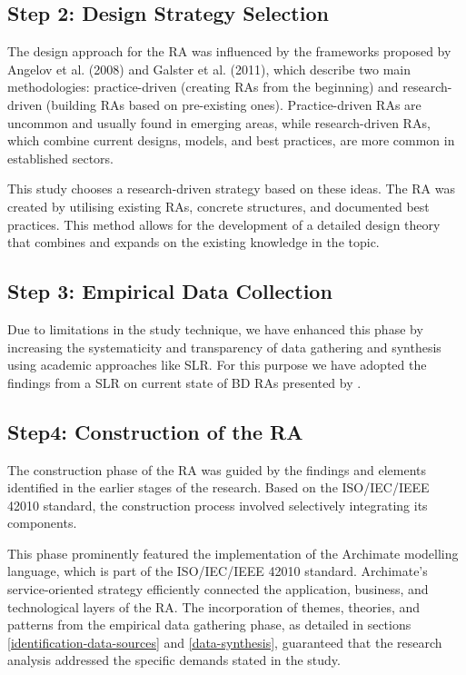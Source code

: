 \documentclass[journal]{IEEEtran}
\begin{document}
\subsection{Step 2: Design Strategy Selection}

The design approach for the RA was influenced by the frameworks proposed by Angelov et al. (2008) and Galster et al. (2011), which describe two main methodologies: practice-driven (creating RAs from the beginning) and research-driven (building RAs based on pre-existing ones). Practice-driven RAs are uncommon and usually found in emerging areas, while research-driven RAs, which combine current designs, models, and best practices, are more common in established sectors.

This study chooses a research-driven strategy based on these ideas. The RA was created by utilising existing RAs, concrete structures, and documented best practices. This method allows for the development of a detailed design theory that combines and expands on the existing knowledge in the topic.

\subsection{Step 3: Empirical Data Collection} \label{theSLR}

Due to limitations in the study technique, we have enhanced this phase by increasing the systematicity and transparency of data gathering and synthesis using academic approaches like SLR. For this purpose we have adopted the findings from a SLR on current state of BD RAs presented by \cite{ataei2022state}.

\subsection{Step4: Construction of the RA}
The construction phase of the RA was guided by the findings and elements identified in the earlier stages of the research. Based on the ISO/IEC/IEEE 42010 standard, the construction process involved selectively integrating its components.

This phase prominently featured the implementation of the Archimate modelling language, which is part of the ISO/IEC/IEEE 42010 standard. Archimate's service-oriented strategy efficiently connected the application, business, and technological layers of the RA. The incorporation of themes, theories, and patterns from the empirical data gathering phase, as detailed in sections \ref{identification-data-sources} and \ref{data-synthesis}, guaranteed that the research analysis addressed the specific demands stated in the study.
\end{document}
